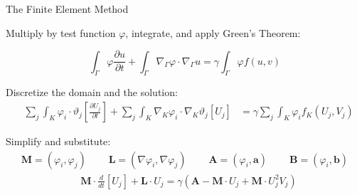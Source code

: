 \documentclass{beamer}
\begin{document}
        \begin{frame}{The Finite Element Method}  
        
        Multiply by test function $\varphi$, integrate, and apply Green's Theorem:   
        
        \begin{equation*}\label{eq:weak2}
        \int_\Gamma \varphi\frac{\partial u}{\partial t} + \int_\Gamma \nabla_\Gamma\varphi\cdot\nabla_\Gamma u = \gamma\int_\Gamma \varphi f(u,v)
        \end{equation*} 
        
        Discretize the domain and the solution:        
        \begin{equation*}
        \begin{aligned}
        &\sum_j 
        \int_K \varphi_i\cdot\vartheta_j\left[\frac{\partial U_j}{\partial t}\right] + 
        \sum_j
        \int_K \nabla_K\varphi_i\cdot\nabla_K \vartheta_j \left[U_j\right]  &= 
        \gamma\sum_j
        \int_K \varphi_i f_K(U_j,V_j) 
        \end{aligned}
        \end{equation*}
        
        Simplify and substitute:        
        \begin{equation*}
        \begin{aligned}
        \textbf{M} = (\varphi_i,\varphi_j) ~~~~~~~~~~ \textbf{L} = (\nabla\varphi_i, \nabla\varphi_j) ~~~~~~~~~~ \textbf{A} = (\varphi_i,\textbf{a}) ~~~~~~~~~~ \textbf{B} = (\varphi_i,\textbf{b})
        \end{aligned}
        \end{equation*}        
        \begin{equation*}
        \begin{aligned}
        &\textbf{M}\cdot\frac{d}{dt}[U_j] + \textbf{L}\cdot U_j = \gamma (\textbf{A} - \textbf{M}\cdot U_j + \textbf{M}\cdot U_j^2V_j) 
        \end{aligned}
        \end{equation*}
                     
        \end{frame}
    
\end{document}
